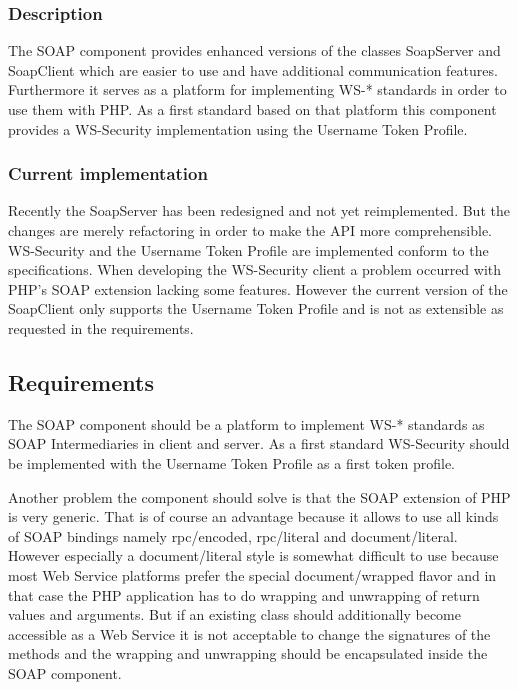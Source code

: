 \documentclass[10pt,final,a4paper,oneside]{article}
\begin{document}
\subsubsection{Description}
The SOAP component provides enhanced versions of
the classes SoapServer and SoapClient
which are easier to use and have additional
communication features.
Furthermore it serves as a platform for implementing
WS-* standards in order to use them with PHP.
As a first standard based on that platform
this component provides a WS-Security implementation
using the Username Token Profile.


\subsubsection{Current implementation}
Recently the SoapServer has been redesigned
and not yet reimplemented.
But the changes are merely refactoring
in order to make the API more comprehensible.
WS-Security and the Username Token Profile
are implemented conform to the specifications.
When developing the WS-Security client a
problem occurred with PHP's SOAP extension
lacking some features.
However the current version of the SoapClient only supports the
Username Token Profile and is not as extensible
as requested in the requirements. 


\subsection{Requirements}\label{subsec:SOAPRequirements}
The SOAP component should be
a platform to implement WS-* standards
as SOAP Intermediaries in client and server.
As a first standard WS-Security should be implemented
with the Username Token Profile as a first token profile.

Another problem the component should solve
is that the SOAP extension of PHP is very generic.
That is of course an advantage because it allows
to use all kinds of SOAP bindings namely
rpc/encoded, rpc/literal and document/literal.
However especially a document/literal style
is somewhat difficult to use because most
Web Service platforms prefer the special
document/wrapped flavor and in that case
the PHP application has to do wrapping and
unwrapping of return values and arguments.
But if an existing class should additionally
become accessible as a Web Service
it is not acceptable to change the signatures
of the methods and the wrapping and unwrapping
should be encapsulated inside the SOAP component.
\end{document}
